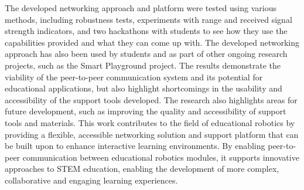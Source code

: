 The developed networking approach and platform were tested using various methods, including robustness tests, experiments with range and received signal strength indicators, and two hackathons with students to see how they use the capabilities provided and what they can come up with. The developed networking approach has also been used by students and as part of other ongoing research projects, such as the Smart Playground project. The results demonstrate the viability of the peer-to-peer communication system and its potential for educational applications, but also highlight shortcomings in the usability and accessibility of the support tools developed. The research also highlights areas for future development, such as improving the quality and accessibility of support tools and materials. This work contributes to the field of educational robotics by providing a flexible, accessible networking solution and support platform that can be built upon to enhance interactive learning environments. By enabling peer-to-peer communication between educational robotics modules, it supports innovative approaches to STEM education, enabling the development of more complex, collaborative and engaging learning experiences.

